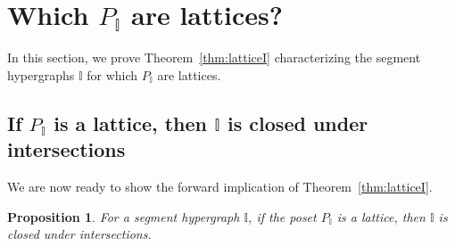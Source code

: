 \documentclass[reqno]{amsart}
\newtheorem{proposition}[theorem]{Proposition}
\theoremstyle{definition}
\newcommand{\II}{\mathbb I} %
\begin{document}

\section{Which $P_\II$ are lattices?}
\label{sec:LatticePI}

In this section, we  prove  Theorem~\ref{thm:latticeI} characterizing the segment hypergraphs $\II$ for which $P_\II$ are lattices.

\subsection{If $P_\II$ is a lattice, then $\II$ is closed under intersections}  
\label{subsec:latticeI}

We are now ready to show the forward implication of Theorem~\ref{thm:latticeI}.

\begin{proposition}
	For a segment hypergraph $\II$, if the poset $P_\II$ is a lattice, then $\II$ is closed under intersections.
\end{proposition}
\end{document}
